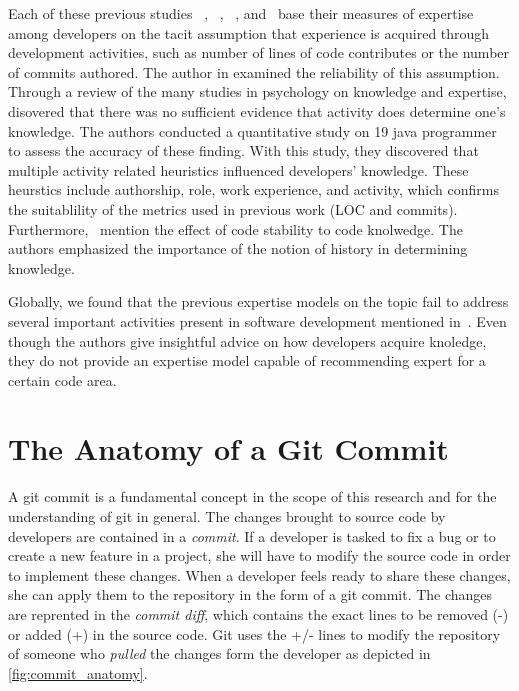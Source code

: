 Each of these previous studies ~\citep{Bhattacharya}, ~\citep{mockus02}, ~\citep{McDonald}, and~\citep{Fritz-2007} base their measures of expertise among developers on the tacit assumption that experience is acquired through development activities, such as number of lines of code contributes or the number of commits authored. The author in \citep{Fritz-2007} examined the reliability of this assumption. Through a review of the many studies in psychology on knowledge and expertise, \citep{Fritz-2007} disovered that there was no sufficient evidence that activity does determine one's knowledge. The authors conducted a quantitative study on 19 java programmer to assess the accuracy of these finding. With this study, they discovered that multiple activity related heuristics influenced developers' knowledge. These heurstics include authorship, role, work experience, and activity, which confirms the suitablility of the metrics used in previous work (LOC and commits). Furthermore,~\citep{Fritz-2007} mention the effect of code stability to code knolwedge. The authors emphasized the importance of the notion of history in determining knowledge.  

Globally, we found that the previous expertise models on the topic fail to address several important activities present in software development mentioned in~\citep{Fritz-2007}. Even though the authors give insightful advice on how developers acquire knoledge, they do not provide an expertise model capable of recommending expert for a certain code area. 

\section{The Anatomy of a Git Commit}
\label{sec:commit_anatomy}

A git commit is a fundamental concept in the scope of this research and for the understanding of git in general. The changes brought to source code by developers are contained in a \textit{commit}. If a developer is tasked to fix a bug or to create a new feature in a project, she will have to modify the source code in order to implement these changes. When a developer feels ready to share these changes, she can apply them to the repository in the form of a git commit. The changes are reprented in the \textit{commit diff}, which contains the exact lines to be removed (-) or added (+) in the source code. Git uses the +/- lines to modify the repository of someone who \textit{pulled} the changes form the developer as depicted in \autoref{fig:commit_anatomy}. 


